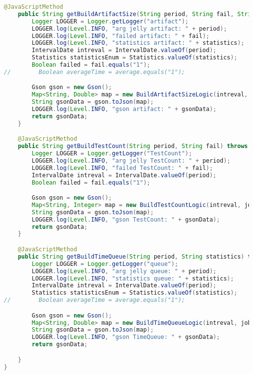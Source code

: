 \begin{lstlisting}[language=Java]
    @JavaScriptMethod
    public String getBuildArtifactSize(String period, String fail, String statistics) throws ParseException {
        Logger LOGGER = Logger.getLogger("artifact");
        LOGGER.log(Level.INFO, "arg jelly artifact: " + period);
        LOGGER.log(Level.INFO, "failed artifact: " + fail);
        LOGGER.log(Level.INFO, "statistics artifact: " + statistics);
        IntervalDate intreval = IntervalDate.valueOf(period);
        Statistics statisticsEnum = Statistics.valueOf(statistics);
        Boolean failed = fail.equals("1");
//        Boolean averageTime = average.equals("1");

        Gson gson = new Gson();
        Map<String, Double> map = new BuildArtifactSizeLogic(intreval, failed, job.getBuilds()).getArtifactSize(statisticsEnum);
        String gsonData = gson.toJson(map);
        LOGGER.log(Level.INFO, "gson artifact: " + gsonData);
        return gsonData;
    }

    @JavaScriptMethod
    public String getBuildTestCount(String period, String fail) throws ParseException {
        Logger LOGGER = Logger.getLogger("TestCount");
        LOGGER.log(Level.INFO, "arg jelly TestCount: " + period);
        LOGGER.log(Level.INFO, "failed TestCount: " + fail);
        IntervalDate intreval = IntervalDate.valueOf(period);
        Boolean failed = fail.equals("1");

        Gson gson = new Gson();
        Map<String, Integer> map = new BuildTestCountLogic(intreval, job.getBuilds()).getTestCount();
        String gsonData = gson.toJson(map);
        LOGGER.log(Level.INFO, "gson TestCount: " + gsonData);
        return gsonData;
    }

    @JavaScriptMethod
    public String getBuildTimeQueue(String period, String statistics) throws ParseException {
        Logger LOGGER = Logger.getLogger("queue");
        LOGGER.log(Level.INFO, "arg jelly queue: " + period);
        LOGGER.log(Level.INFO, "statistics queue: " + statistics);
        IntervalDate intreval = IntervalDate.valueOf(period);
        Statistics statisticsEnum = Statistics.valueOf(statistics);
//        Boolean averageTime = average.equals("1");

        Gson gson = new Gson();
        Map<String, Double> map = new BuildTimeQueueLogic(intreval, job.getBuilds()).getTimeQueue(statisticsEnum);
        String gsonData = gson.toJson(map);
        LOGGER.log(Level.INFO, "gson TimeQueue: " + gsonData);
        return gsonData;

    }
}


\end{lstlisting}

